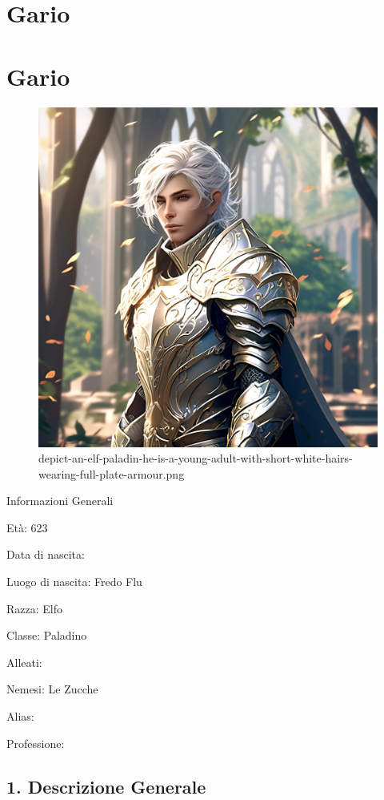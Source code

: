 \section{Gario}
\section{Gario}


\begin{figure}
\centering
\includegraphics{depict-an-elf-paladin-he-is-a-young-adult-with-short-white-hairs-wearing-full-plate-armour.png}
\caption{depict-an-elf-paladin-he-is-a-young-adult-with-short-white-hairs-wearing-full-plate-armour.png}
\end{figure}

Informazioni Generali

Età: 623

Data di nascita:

Luogo di nascita: Fredo Flu

Razza: Elfo

Classe: Paladino

Alleati:

Nemesi: Le Zucche

Alias:

Professione:


\subsection{1. Descrizione Generale}\label{descrizione-generale}



